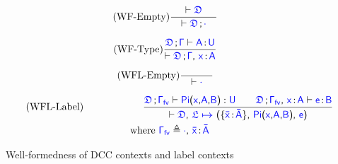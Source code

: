 \begin{figure}[H]
\renewcommand{\arraystretch}{1.3}
	\begin{equation}
		\tag{WF-Empty}
		\frac{\vdash \target{\fdef} }{\quad \vdash \target{\fdef} \semicolon \target{\cdot} \quad}
	\end{equation}\vspace{0.1cm}

	\begin{equation}
		\tag{WF-Type}
		\frac{\target{\fdef}\semicolon \target{\Gamma} \vdash \itemtype{A}{U}}
		{\vdash \target{\fdef}\semicolon \target{\Gamma}\sfcomma \itemtype{x}{A}}
	\end{equation}

	\begin{equation}
		\tag{WFL-Empty}
		\frac{}{\quad \vdash \target{\cdot} \quad}
	\end{equation}
	
	\begin{multline}
		\tag{WFL-Label}
		\qquad\qquad\qquad
		\frac{
			\target{\fdef}\semicolon \target{\Gamma_{fv}} \vdash \targetpi{x}{A}{B} \mathrel{:} \target{U} \qquad
			\target{\fdef}\semicolon \target{\Gamma_{fv}}\sfcomma \itemtype{x}{A} \vdash \itemtype{e}{B}
			}
		{
			\vdash \target{\fdef}\sfcomma \itemdef{\target{\flabel}}{\itemtype{\bar{x}}{\bar{A}}}{\targetpi{x}{A}{B}}{\target{e}}
		}\\
		\text{where } \target{\Gamma_{fv}} \triangleq \target{\cdot}\sfcomma \itemtype{\bar{x}}{\bar{A}}
	\end{multline}
	\caption{Well-formedness of DCC contexts and label contexts}
    \label{fig:dcc context}
\end{figure}

